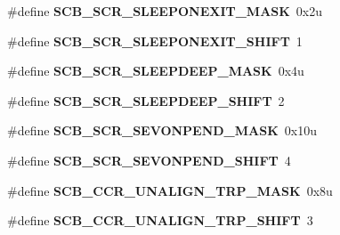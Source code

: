 \begin{DoxyCompactItemize}
\item 
\hypertarget{group___s_c_b___register___masks_ga14474f291208128b6d817bd48c684fc9}{}\#define {\bfseries S\+C\+B\+\_\+\+S\+C\+R\+\_\+\+S\+L\+E\+E\+P\+O\+N\+E\+X\+I\+T\+\_\+\+M\+A\+S\+K}~0x2u\label{group___s_c_b___register___masks_ga14474f291208128b6d817bd48c684fc9}

\item 
\hypertarget{group___s_c_b___register___masks_gafc63d56cb8407238a9abe5ad54a00809}{}\#define {\bfseries S\+C\+B\+\_\+\+S\+C\+R\+\_\+\+S\+L\+E\+E\+P\+O\+N\+E\+X\+I\+T\+\_\+\+S\+H\+I\+F\+T}~1\label{group___s_c_b___register___masks_gafc63d56cb8407238a9abe5ad54a00809}

\item 
\hypertarget{group___s_c_b___register___masks_ga60307c79f9fb0f1b5b4afe848166f3cf}{}\#define {\bfseries S\+C\+B\+\_\+\+S\+C\+R\+\_\+\+S\+L\+E\+E\+P\+D\+E\+E\+P\+\_\+\+M\+A\+S\+K}~0x4u\label{group___s_c_b___register___masks_ga60307c79f9fb0f1b5b4afe848166f3cf}

\item 
\hypertarget{group___s_c_b___register___masks_ga43cddab3431812a4cdf202bf359506da}{}\#define {\bfseries S\+C\+B\+\_\+\+S\+C\+R\+\_\+\+S\+L\+E\+E\+P\+D\+E\+E\+P\+\_\+\+S\+H\+I\+F\+T}~2\label{group___s_c_b___register___masks_ga43cddab3431812a4cdf202bf359506da}

\item 
\hypertarget{group___s_c_b___register___masks_ga6603e0e99280ae6a73d7ddf1d38075f5}{}\#define {\bfseries S\+C\+B\+\_\+\+S\+C\+R\+\_\+\+S\+E\+V\+O\+N\+P\+E\+N\+D\+\_\+\+M\+A\+S\+K}~0x10u\label{group___s_c_b___register___masks_ga6603e0e99280ae6a73d7ddf1d38075f5}

\item 
\hypertarget{group___s_c_b___register___masks_ga61abde1285bfce2342c1e93a1ecd3166}{}\#define {\bfseries S\+C\+B\+\_\+\+S\+C\+R\+\_\+\+S\+E\+V\+O\+N\+P\+E\+N\+D\+\_\+\+S\+H\+I\+F\+T}~4\label{group___s_c_b___register___masks_ga61abde1285bfce2342c1e93a1ecd3166}

\item 
\hypertarget{group___s_c_b___register___masks_ga9d58c7dfa1dbab9f9bfa87a46504b9c2}{}\#define {\bfseries S\+C\+B\+\_\+\+C\+C\+R\+\_\+\+U\+N\+A\+L\+I\+G\+N\+\_\+\+T\+R\+P\+\_\+\+M\+A\+S\+K}~0x8u\label{group___s_c_b___register___masks_ga9d58c7dfa1dbab9f9bfa87a46504b9c2}

\item 
\hypertarget{group___s_c_b___register___masks_ga41a70c541532f6ad88b841c7da86c0f6}{}\#define {\bfseries S\+C\+B\+\_\+\+C\+C\+R\+\_\+\+U\+N\+A\+L\+I\+G\+N\+\_\+\+T\+R\+P\+\_\+\+S\+H\+I\+F\+T}~3\label{group___s_c_b___register___masks_ga41a70c541532f6ad88b841c7da86c0f6}


\end{DoxyCompactItemize}
